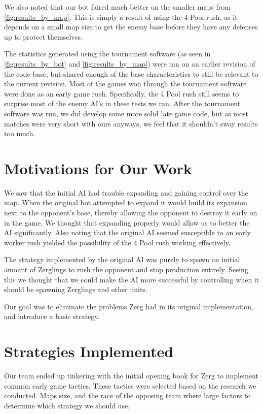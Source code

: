\documentclass{article}
\begin{document}
We also noted that our bot faired much better on the smaller maps from \autoref{fig:results_by_map}. This is simply a result of using the 4 Pool rush, as it depends on a small map size to get the enemy base before they have any defenses up to protect themselves.

The statistics generated using the tournament software \cite{tournament_software} (as seen in \autoref{fig:results_by_bot} and \autoref{fig:results_by_map}) were ran on an earlier revision of the code base, but shared enough of the base characteristics to still be relevant to the current revision. Most of the games won through the tournament software were done as an early game rush. Specifically, the 4 Pool rush still seems to surprise most of the enemy AI's in these tests we ran. After the tournament software was run, we did develop some more solid late game code, but as most matches were very short with ours anyways, we feel that it shouldn't sway results too much.
\section{Motivations for Our Work}

We saw that the initial AI had trouble expanding and gaining control over the map. When the original bot attempted to expand it would build its expansion next to the opponent's base, thereby allowing the opponent to destroy it early on in the game. We thought that expanding properly would allow us to better the AI significantly. Also noting that the original AI seemed susceptible to an early worker rush yielded the possibility of the 4 Pool rush working effectively.

The strategy implemented by the original AI was purely to spawn an initial amount of Zerglings to rush the opponent and stop production entirely. Seeing this we thought that we could make the AI more successful by controlling when it should be spawning Zerglings and other units. 

Our goal was to eliminate the problems Zerg had in its original implementation, and introduce a basic strategy. 

\section{Strategies Implemented}

Our team ended up tinkering with the initial opening book for Zerg to implement common early game tactics. These tactics were selected based on the research we conducted. Maps size, and the race of the opposing team where large factors to determine which strategy we should use.
\end{document}
